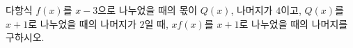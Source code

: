 다항식 $f(x)$를 $x-3$으로 나누었을 때의 몫이 $Q(x)$, 나머지가 $4$이고, $Q(x)$를 $x+1$로 나누었을 때의 나머지가 $2$일 때, $xf(x)$를 $x+1$로 나누었을 때의 나머지를 구하시오.
